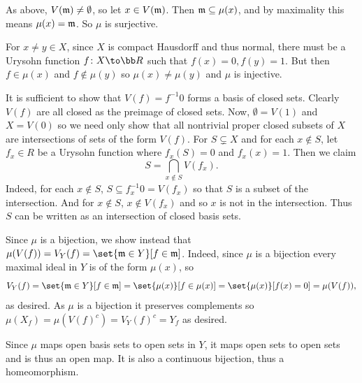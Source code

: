         \item As above, $V({{\frak m}})\neq\emptyset$, so let $x\in V({{\frak m}})$.
        Then ${{\frak m}}\subseteq\mu(x)$, and by maximality this means $\mu(x)={{\frak m}}$.
        So $\mu$ is surjective.
    \eenum

    \item For $x\neq y\in X$, since $X$ is compact Hausdorff and thus normal, there must be a Urysohn function $f\colon X\to\bR$ such that $f(x)=0,f(y)=1$.
    But then $f\in\mu(x)$ and $f\notin\mu(y)$ so $\mu(x)\neq\mu(y)$ and $\mu$ is injective.

    \item It is sufficient to show that $V(f)=f^{-1}0$ forms a basis of closed sets.
    Clearly $V(f)$ are all closed as the preimage of closed sets.
    Now, $\emptyset=V(1)$ and $X=V(0)$ so we need only show that all nontrivial proper closed subsets of $X$ are intersections of sets of the form $V(f)$.
    For $S\subsetneq X$ and for each $x\notin S$, let $f_x\in R$ be a Urysohn function where $f_x(S)=0$ and $f_x(x)=1$.
    Then we claim
    $$ S = \bigcap_{x\notin S}V(f_x) . $$
    Indeed, for each $x\notin S$, $S\subseteq f_x^{-1}0=V(f_x)$ so that $S$ is a subset of the intersection.
    And for $x\notin S$, $x\notin V(f_x)$ and so $x$ is not in the intersection.
    Thus $S$ can be written as an intersection of closed basis sets.

    Since $\mu$ is a bijection, we show instead that $\mu(V(f))=V_Y(f)=\set{\m\in Y}[f\in\m]$.
    Indeed, since $\mu$ is a bijection every maximal ideal in $Y$ is of the form $\mu(x)$, so
    $$ V_Y(f) = \set{\m\in Y}[f\in\m] = \set{\mu(x)}[f\in\mu(x)] = \set{\mu(x)}[f(x)=0] = \mu(V(f)) , $$
    as desired.
    As $\mu$ is a bijection it preserves complements so $\mu(X_f)=\mu(V(f)^c)=V_Y(f)^c=Y_f$ as desired.

    \item Since $\mu$ maps open basis sets to open sets in $Y$, it maps open sets to open sets and is thus an open map.
    It is also a continuous bijection, thus a homeomorphism.
\eenum

\bye
